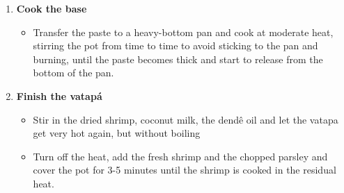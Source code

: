 \documentclass[11pt,letterpaper]{article}
\begin{document}
\begin{description}
\begin{enumerate}
	\item {\bf Cook the base}
	\begin{itemize}
	\item Transfer the paste to a heavy-bottom pan and cook at moderate heat, stirring the pot from time to time to avoid sticking to the pan and burning, until the paste becomes thick and start to release from the bottom of the pan.
	\end{itemize}
	
	\item {\bf Finish the vatap\'a}
	\begin{itemize}
	\item Stir in the dried shrimp, coconut milk, the dend\^e oil and let the vatapa get very hot again, but without boiling
	\item Turn off the heat, add the fresh shrimp and the chopped parsley and cover the pot for 3-5 minutes until the shrimp is cooked in the residual heat.
	\end{itemize}

	\end{enumerate}
\end{description}
\end{document}
